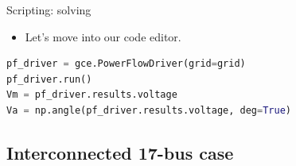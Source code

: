 \begin{frame}[fragile]{Scripting: solving}
    \begin{itemize}
    \item Let's move into our code editor.
    \end{itemize}
    \begin{lstlisting}[language=Python]
pf_driver = gce.PowerFlowDriver(grid=grid)
pf_driver.run()
Vm = pf_driver.results.voltage
Va = np.angle(pf_driver.results.voltage, deg=True)
    \end{lstlisting}
\end{frame}

\subsection{Interconnected 17-bus case}

